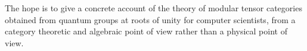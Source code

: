 %
%
%
%
%
The hope is to give a concrete account of the theory of modular tensor
categories obtained from quantum groups at roots of unity for computer
scientists, from a category theoretic and algebraic point of view rather than a
physical point of view. 

